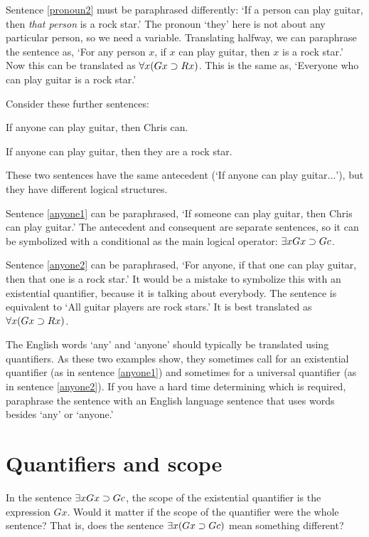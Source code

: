Sentence \ref{pronoun2} must be paraphrased differently: `If a person can play guitar, then \emph{that person} is a rock star.' The pronoun `they' here is not about any particular person, so we need a variable. Translating halfway, we can paraphrase the sentence as, `For any person $x$, if $x$ can play guitar, then $x$ is a rock star.' Now this can be translated as $\forall x (Gx \supset Rx)$. This is the same as, `Everyone who can play guitar is a rock star.'


Consider these further sentences:

\begin{earg}
\item[\ex{anyone1}] If anyone can play guitar, then Chris can.
\item[\ex{anyone2}] If anyone can play guitar, then they are a rock star.
\end{earg}

These two sentences have the same antecedent (`If anyone can play guitar$\ldots$'), but they have different logical structures.

Sentence \ref{anyone1} can be paraphrased, `If someone can play guitar, then Chris can play guitar.' The antecedent and consequent are separate sentences, so it can be symbolized with a conditional as the main logical operator: $\exists x Gx \supset Gc$.

Sentence \ref{anyone2} can be paraphrased, `For anyone, if that one can play guitar, then that one is a rock star.' It would be a mistake to symbolize this with an existential quantifier, because it is talking about everybody. The sentence is equivalent to `All guitar players are rock stars.' It is best translated as $\forall x(Gx \supset Rx)$.

The English words `any' and `anyone' should typically be translated using quantifiers. As these two examples show, they sometimes call for an existential quantifier (as in sentence \ref{anyone1}) and sometimes for a universal quantifier (as in sentence \ref{anyone2}). If you have a hard time determining which is required, paraphrase the sentence with an English language sentence that uses words besides `any' or `anyone.'


\section{Quantifiers and scope}

In the sentence $\exists x Gx \supset Gc$, the scope of the existential quantifier is the expression $Gx$. Would it matter if the scope of the quantifier were the whole sentence? That is, does the sentence $\exists x (Gx \supset Gc)$ mean something different?

